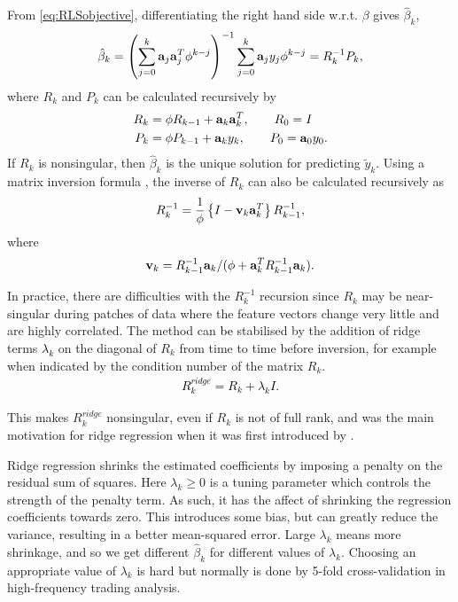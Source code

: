 From \eqref{eq:RLSobjective}, differentiating the right hand side w.r.t. $\beta$ gives $\hat{\beta}_k$,
$$\hat{\beta}_k = \left(\sum_{j=0}^k \mathbf{a}_j \mathbf{a}_j^T \phi^{k-j} \right)^{-1} \sum_{j=0}^k \mathbf{a}_j y_j \phi^{k-j} = R_k^{-1} P_k,$$
where $R_k$ and $P_k$ can be calculated recursively by
\begin{align}\label{sec:recursion}
R_k &= \phi  R_{k-1} + \mathbf{a}_k \mathbf{a}_k^T, \qquad R_0 = I \nonumber  \\
P_k &= \phi P_{k-1} + \mathbf{a}_k y_k, \qquad P_0 = \mathbf{a}_0 y_0.
\end{align}
If $R_k $ is nonsingular, then $\hat{\beta}_k$ is the unique solution for predicting $\tilde{y}_{k}$.
Using a matrix inversion formula \citet{rao2009linear}, the inverse of $R_k$ can also be calculated recursively as
$$R_k^{-1} = \frac{1}{\phi} \left\{I - \mathbf{v}_k \mathbf{a}_k^T \right\}R_{k-1}^{-1},$$
where 
$$ \mathbf{v}_k = R_{k-1}^{-1}\mathbf{a}_k/(\phi + \mathbf{a}^T_k R_{k-1}^{-1} \mathbf{a}_k).$$ 


In practice, there are difficulties with the  $R_{k}^{-1}$ recursion since $ R_{k}$ may be near-singular during patches of data where the feature vectors change very little and are highly correlated. The method can \textcolor{black}{be} stabilised by the addition of ridge terms \textcolor{black}{$\lambda_k$} on the diagonal of $R_k$ from time to time before inversion, for example when indicated by the condition number of the matrix $R_k$.
\textcolor{black}{
	\begin{align}\label{sec:ridge}
	R_k^{ridge} = R_k + \lambda_k I \nonumber.
	\end{align}
}

This makes $R_k^{ridge}$ nonsingular, even if $R_k$ is not of full rank, and was the main motivation for ridge regression when it was first introduced by \citet{hoerl1970ridge}.

Ridge regression shrinks the estimated coefficients by imposing a penalty on the residual sum of squares. Here $\lambda_k \geq 0 $ is a tuning parameter which controls the strength of the penalty term. As such, it has the affect of shrinking the regression coefficients towards zero. This introduces some bias, but can greatly reduce the variance, resulting in a better mean-squared error. Large $\lambda_k$ means more shrinkage, and so we get different $\hat{\beta}_k$ for different values of $\lambda_k$. Choosing an appropriate value of $\lambda_k$ is hard but normally is done by 5-fold cross-validation in high-frequency trading analysis.

